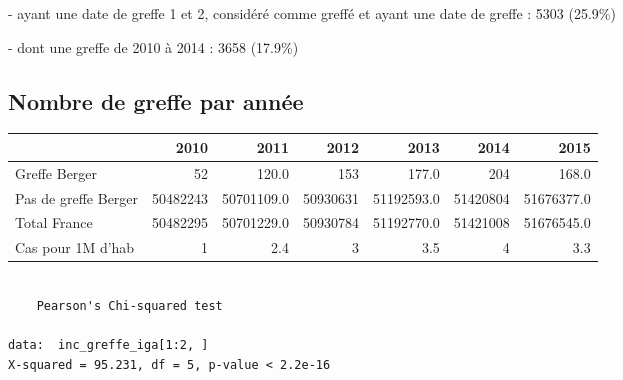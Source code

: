 \documentclass[11pt,a4paper]{article}\usepackage[]{graphicx}\usepackage[]{color}
\makeatletter
\newenvironment{kframe}{%
 \def\at@end@of@kframe{}%
 \ifinner\ifhmode%
  \def\at@end@of@kframe{\end{minipage}}%
  \begin{minipage}{\columnwidth}%
 \fi\fi%
 \def\FrameCommand##1{\hskip\@totalleftmargin \hskip-\fboxsep
 \colorbox{shadecolor}{##1}\hskip-\fboxsep
     \hskip-\linewidth \hskip-\@totalleftmargin \hskip\columnwidth}%
 \MakeFramed {\advance\hsize-\width
   \@totalleftmargin\z@ \linewidth\hsize
   \@setminipage}}%
 {\par\unskip\endMakeFramed%
 \at@end@of@kframe}
\newenvironment{knitrout}{}{} %
\makeatother
\begin{document}
- ayant une date de greffe 1 et 2, considéré comme greffé et ayant une date de greffe : 5303 (25.9\%)

\qquad - dont une greffe de 2010 à 2014 : 3658 (17.9\%)

  \subsection{Nombre de greffe par année}

\begin{table}[H]
\centering
\begin{tabular}{lrrrrrr}
  \hline
 & 2010 & 2011 & 2012 & 2013 & 2014 & 2015 \\ 
  \hline
Greffe Berger & 52 & 120.0 & 153 & 177.0 & 204 & 168.0 \\ 
  Pas de greffe Berger & 50482243 & 50701109.0 & 50930631 & 51192593.0 & 51420804 & 51676377.0 \\ 
  Total France & 50482295 & 50701229.0 & 50930784 & 51192770.0 & 51421008 & 51676545.0 \\ 
  Cas pour 1M d'hab &  1 & 2.4 &  3 & 3.5 &  4 & 3.3 \\ 
   \hline
\end{tabular}
\end{table}


\begin{knitrout}
\color{fgcolor}\begin{kframe}
\begin{verbatim}

	Pearson's Chi-squared test

data:  inc_greffe_iga[1:2, ]
X-squared = 95.231, df = 5, p-value < 2.2e-16
\end{verbatim}
\end{kframe}
\end{knitrout}
\end{document}

